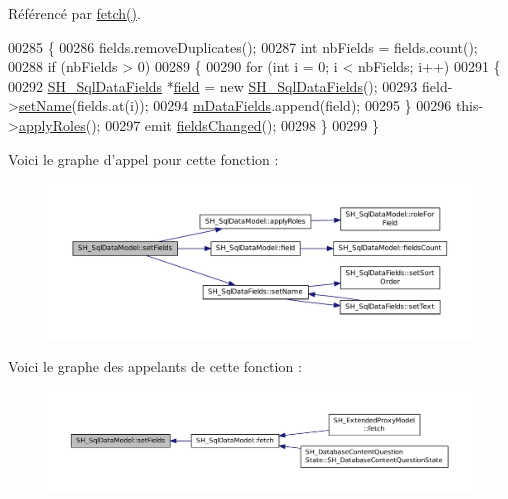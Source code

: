 Référencé par \hyperlink{classSH__SqlDataModel_a8d9b08d282a304945b9ee2f474020980}{fetch()}.


\begin{DoxyCode}
00285 \{
00286     fields.removeDuplicates();
00287     \textcolor{keywordtype}{int} nbFields = fields.count();
00288     \textcolor{keywordflow}{if} (nbFields > 0)
00289     \{
00290         \textcolor{keywordflow}{for} (\textcolor{keywordtype}{int} i = 0; i < nbFields; i++)
00291         \{
00292             \hyperlink{classSH__SqlDataFields}{SH\_SqlDataFields} *\hyperlink{classSH__SqlDataModel_a442cdea9007cb61ed9d2fbdd01ddccbf}{field} = \textcolor{keyword}{new} \hyperlink{classSH__SqlDataFields}{SH\_SqlDataFields}();
00293             field->\hyperlink{classSH__SqlDataFields_ab658a817f459e5d0a8c0f5c4e8c28a9d}{setName}(fields.at(i));
00294             \hyperlink{classSH__SqlDataModel_a3e998f75dd5b3193783612002461888d}{mDataFields}.append(field);
00295         \}
00296         this->\hyperlink{classSH__SqlDataModel_a2e529bea67d6b31d8eb4723a81a1b354}{applyRoles}();
00297         emit \hyperlink{classSH__SqlDataModel_aca80a3b90b76f217e2878f99607c78ed}{fieldsChanged}();
00298     \}
00299 \}
\end{DoxyCode}


Voici le graphe d'appel pour cette fonction \-:\nopagebreak
\begin{figure}[H]
\begin{center}
\leavevmode
\includegraphics[width=350pt]{classSH__SqlDataModel_a1a345d536e6e08a03cb333351ce677af_cgraph}
\end{center}
\end{figure}




Voici le graphe des appelants de cette fonction \-:\nopagebreak
\begin{figure}[H]
\begin{center}
\leavevmode
\includegraphics[width=350pt]{classSH__SqlDataModel_a1a345d536e6e08a03cb333351ce677af_icgraph}
\end{center}
\end{figure}


